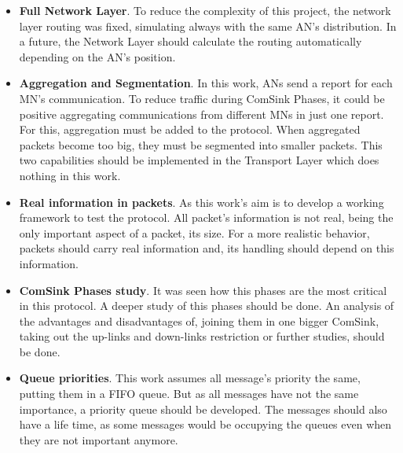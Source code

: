 \begin{itemize}
  \item \textbf{Full Network Layer}. To reduce the complexity of this project, the network layer routing was fixed, simulating always with the same
  \ac{AN}'s distribution. In a future, the Network Layer should calculate the routing automatically depending on the \ac{AN}'s position.

  \item \textbf{Aggregation and Segmentation}. In this work, \acp{AN} send a report for each \ac{MN}'s communication. To reduce traffic during
  ComSink Phases, it could be positive aggregating communications from different \acp{MN} in just one report. For this, aggregation must be added 
  to the protocol. When aggregated packets become too big, they must be segmented into smaller packets. This two capabilities should be implemented
  in the Transport Layer which does nothing in this work.

  \item \textbf{Real information in packets}. As this work's aim is to develop a working framework to test the protocol. All packet's 
  information is not real, being the only important aspect of a packet, its size. For a more realistic behavior, packets should carry 
  real information and, its handling should depend on this information.

  \item \textbf{ComSink Phases study}. It was seen how this phases are the most critical in this protocol. A deeper study of this phases
  should be done. An analysis of the advantages and disadvantages of, joining them in one bigger ComSink, taking out the up-links and down-links 
  restriction or further studies, should be done.

  \item \textbf{Queue priorities}. This work assumes all message's priority the same, putting them in a \ac{FIFO} queue. But as all messages have
  not the same importance, a priority queue should be developed. The messages should also have a life time, as some messages would be occupying 
  the queues even when they are not important anymore.

\end{itemize}
